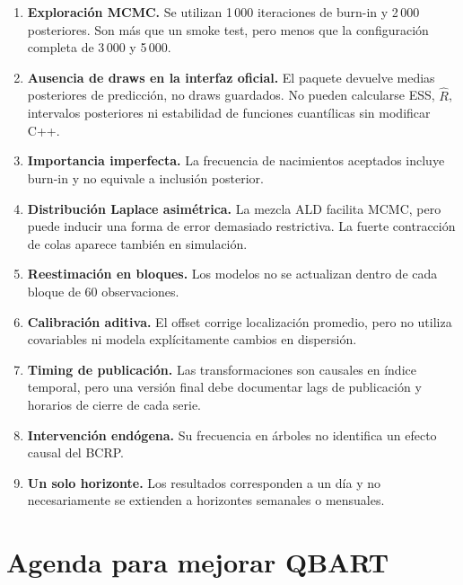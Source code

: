 \documentclass[11pt,a4paper]{article}
\begin{document}
\begin{enumerate}[leftmargin=*]
  \item \textbf{Exploración MCMC.} Se utilizan 1\,000 iteraciones de burn-in
  y 2\,000 posteriores. Son más que un smoke test, pero menos que la
  configuración completa de 3\,000 y 5\,000.

  \item \textbf{Ausencia de draws en la interfaz oficial.} El paquete devuelve
  medias posteriores de predicción, no draws guardados. No pueden calcularse
  ESS, \(\widehat R\), intervalos posteriores ni estabilidad de funciones
  cuantílicas sin modificar C++.

  \item \textbf{Importancia imperfecta.} La frecuencia de nacimientos
  aceptados incluye burn-in y no equivale a inclusión posterior.

  \item \textbf{Distribución Laplace asimétrica.} La mezcla ALD facilita MCMC,
  pero puede inducir una forma de error demasiado restrictiva. La fuerte
  contracción de colas aparece también en simulación.

  \item \textbf{Reestimación en bloques.} Los modelos no se actualizan dentro
  de cada bloque de 60 observaciones.

  \item \textbf{Calibración aditiva.} El offset corrige localización promedio,
  pero no utiliza covariables ni modela explícitamente cambios en dispersión.

  \item \textbf{Timing de publicación.} Las transformaciones son causales en
  índice temporal, pero una versión final debe documentar lags de publicación
  y horarios de cierre de cada serie.

  \item \textbf{Intervención endógena.} Su frecuencia en árboles no identifica
  un efecto causal del BCRP.

  \item \textbf{Un solo horizonte.} Los resultados corresponden a un día y no
  necesariamente se extienden a horizontes semanales o mensuales.
\end{enumerate}

\section{Agenda para mejorar QBART}
\end{document}
